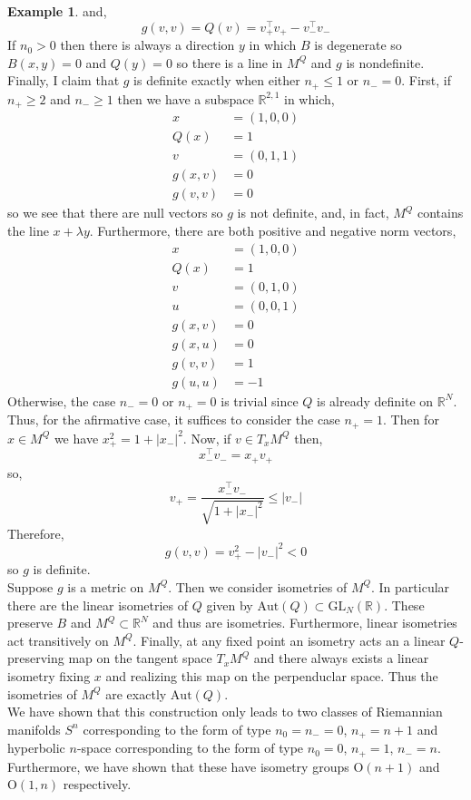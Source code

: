 \documentclass[12pt]{extarticle}
\newcommand{\R}{\mathbb{R}}
\theoremstyle{definition}
\newtheorem{example}[theorem]{Example}
\newcommand{\Orth}[1]{\mathrm{O}\left(#1\right)}
\newcommand{\Aut}[1]{\mathrm{Aut}\left(#1 \right)}
\begin{document}
\begin{example}
and,
\[ g(v,v) = Q(v) = v_+^\top v_+ - v_-^\top v_- \]
If $n_0 > 0$ then there is always a direction $y$ in which $B$ is degenerate so $B(x, y) = 0$ and $Q(y) = 0$ so there is a line in $M^Q$ and $g$ is nondefinite. 
\bigskip\\
Finally, I claim that $g$ is definite exactly when either $n_+ \le 1$ or $n_- = 0$. First, if $n_+ \ge 2$ and $n_{-} \ge 1$ then we have a subspace $\R^{2,1}$ in which,
\begin{align*}
x & = (1,0,0)
\\
Q(x) & = 1
\\
v & = (0, 1, 1)
\\
g(x, v) & = 0
\\
g(v, v) & = 0
\end{align*}
so we see that there are null vectors so $g$ is not definite, and, in fact, $M^Q$ contains the line $x + \lambda y$. Furthermore, there are both positive and negative norm vectors,
\begin{align*}
x & = (1,0,0)
\\
Q(x) & = 1
\\
v & = (0, 1, 0)
\\
u & = (0, 0, 1)
\\
g(x, v) & = 0
\\
g(x, u) & = 0
\\
g(v, v) & = 1
\\
g(u, u) & = -1
\end{align*}
Otherwise, the case $n_{-} = 0$ or $n_{+} = 0$ is trivial since $Q$ is already definite on $\R^N$. Thus, for the afirmative case, it suffices to consider the case $n_{+} = 1$. Then for $x \in M^Q$ we have $x_+^2 = 1 + |x_{-}|^2$. Now, if $v \in T_x M^Q$ then,
\[ x_{-}^\top v_{-} = x_{+} v_{+} \]
so,
\[ v_{+} = \frac{x_{-}^\top v_{-}}{\sqrt{1 + |x_{-}|^2}} \le |v_{-}| \]
Therefore,
\[ g(v, v) = v_+^2 - |v_{-}|^2 < 0 \]
so $g$ is definite. 
\bigskip\\
Suppose $g$ is a metric on $M^Q$. Then we consider isometries of $M^Q$. In particular there are the linear isometries of $Q$ given by $\Aut{Q} \subset \mathrm{GL}_{N}(\R)$. These preserve $B$ and $M^Q \subset \R^N$ and thus are isometries. Furthermore, linear isometries act transitively on $M^Q$. Finally, at any fixed point an isometry acts an a linear $Q$-preserving map on the tangent space $T_x M^Q$ and there always exists a linear isometry fixing $x$ and realizing this map on the perpenduclar space. Thus the isometries of $M^Q$ are exactly $\Aut{Q}$.
\bigskip\\
We have shown that this construction only leads to two classes of Riemannian manifolds $S^n$ corresponding to the form of type $n_0 = n_{-} = 0$, $n_{+} = n + 1$ and hyperbolic $n$-space corresponding to the form of type $n_0 = 0$, $n_{+} = 1$, $n_{-} = n$. Furthermore, we have shown that these have isometry groups $\Orth{n + 1}$ and $\Orth{1, n}$ respectively. 
\end{example}
\end{document}
